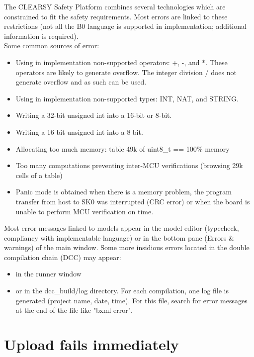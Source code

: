 The CLEARSY Safety Platform combines several technologies which are constrained to fit the safety requirements. Most errors are linked to these restrictions (not all the B0 language is supported in implementation; additional information is required).\\
Some common sources of error:
\begin{itemize}
    \item Using in implementation non-supported operators: +, -, and *. These operators are likely to generate overflow. The integer division / does not generate overflow and as such can be used.
    \item Using in implementation non-supported types: INT, NAT, and STRING.
    \item Writing a 32-bit unsigned int into a 16-bit or 8-bit.
    \item Writing a 16-bit unsigned int into a 8-bit.
    \item Allocating too much memory: table 49k of uint8\_t == 100\% memory
    \item Too many computations preventing inter-MCU verifications (browsing 29k cells of a table)
    \item Panic mode is obtained when there is a memory problem, the program transfer from host to SK0 was interrupted (CRC error) or when the board is unable to perform MCU verification on time.
\end{itemize}
Most error messages linked to models appear in the model editor (typecheck, compliancy with implementable language) or in the bottom pane (Errors \& warnings) of the main window. 
Some more insidious errors located in the double compilation chain (DCC) may appear:
\begin{itemize}
    \item in the runner window 
    \item or in the dcc\_build/log directory. For each compilation, one log file is generated (project name, date, time). For this file, search for error messages at the end of the file like "bxml error".
\end{itemize}

\section{Upload fails immediately}

